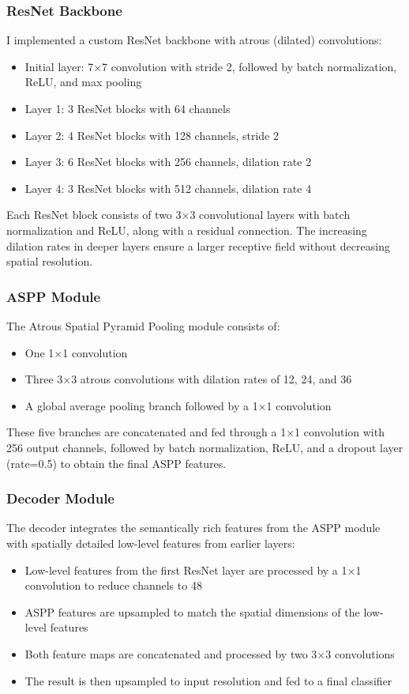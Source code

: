 \documentclass[]{article}
\begin{document}
\subsubsection{ResNet Backbone}
I implemented a custom ResNet backbone with atrous (dilated) convolutions:
\begin{itemize}
    \item Initial layer: 7×7 convolution with stride 2, followed by batch normalization, ReLU, and max pooling
    \item Layer 1: 3 ResNet blocks with 64 channels
    \item Layer 2: 4 ResNet blocks with 128 channels, stride 2
    \item Layer 3: 6 ResNet blocks with 256 channels, dilation rate 2
    \item Layer 4: 3 ResNet blocks with 512 channels, dilation rate 4
\end{itemize}

Each ResNet block consists of two 3×3 convolutional layers with batch normalization and ReLU, along with a residual connection. The increasing dilation rates in deeper layers ensure a larger receptive field without decreasing spatial resolution.

\subsubsection{ASPP Module}
The Atrous Spatial Pyramid Pooling module consists of:
\begin{itemize}
    \item One 1×1 convolution
    \item Three 3×3 atrous convolutions with dilation rates of 12, 24, and 36
    \item A global average pooling branch followed by a 1×1 convolution
\end{itemize}

These five branches are concatenated and fed through a 1×1 convolution with 256 output channels, followed by batch normalization, ReLU, and a dropout layer (rate=0.5) to obtain the final ASPP features.

\subsubsection{Decoder Module}
The decoder integrates the semantically rich features from the ASPP module with spatially detailed low-level features from earlier layers:
\begin{itemize}
    \item Low-level features from the first ResNet layer are processed by a 1×1 convolution to reduce channels to 48
    \item ASPP features are upsampled to match the spatial dimensions of the low-level features
    \item Both feature maps are concatenated and processed by two 3×3 convolutions
    \item The result is then upsampled to input resolution and fed to a final classifier
\end{itemize}
\end{document}
